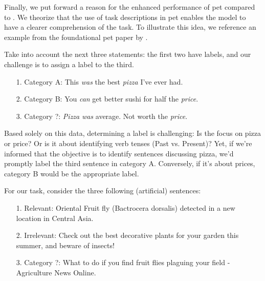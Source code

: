 



Finally, we put forward a reason for the enhanced performance of \gls{pet} compared to \finetuning{}. We theorize that the use of task descriptions in \gls{pet} enables the model to have a clearer comprehension of the task. To illustrate this idea, we reference an example from the foundational \gls{pet} paper by .

Take into account the next three statements: the first two have labels, and our challenge is to assign a label to the third.


\begin{itemize}
    \item[1.] Category A: This \textit{was} the best \textit{pizza} I've ever had.
    \item[2.] Category B: You \textit{can} get better sushi for half the \textit{price}.
    \item[3.] Category ?: \textit{Pizza} \textit{was} average. Not worth the \textit{price}.
\end{itemize}
\vspace{4pt}

Based solely on this data, determining a label is challenging: Is the focus on pizza or price? Or is it about identifying verb tenses (Past vs. Present)? Yet, if we're informed that the objective is to identify sentences discussing pizza, we'd promptly label the third sentence in category A. Conversely, if it's about prices, category B would be the appropriate label. 

For our task, consider the three following (artificial) sentences:
\begin{itemize}
    \item[1.] Relevant: Oriental Fruit fly (Bactrocera dorsalis) detected in a new location in Central Asia.
    \item[2.] Irrelevant: Check out the best decorative plants for your garden this summer, and beware of insects! 
    \item[3.] Category ?: What to do if you find fruit flies plaguing your field - Agriculture News Online. 
\end{itemize}
\vspace{4pt}

